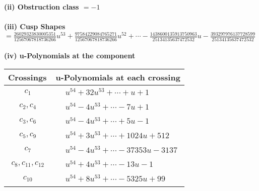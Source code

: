 \documentclass[1p]{elsarticle_modified}
\theoremstyle{definition}
\begin{document}
\flushleft \textbf{(ii) Obstruction class $= -1$}\\~\\
\flushleft \textbf{(iii) Cusp Shapes $= \frac{26029323830005351}{12567067818736266} u^{53}+\frac{97584229084765271}{12567067818736266} u^{52}+\cdots-\frac{1438600135913750963}{25134135637472532} u-\frac{393297976137728599}{25134135637472532}$}\\~\\
\newpage\renewcommand{\arraystretch}{1}
\flushleft \textbf{(iv) u-Polynomials at the component}\newline \\
\begin{tabular}{m{50pt}|m{274pt}}
Crossings & \hspace{64pt}u-Polynomials at each crossing \\
\hline $$\begin{aligned}c_{1}\end{aligned}$$&$\begin{aligned}
&u^{54}+32 u^{53}+\cdots+u+1
\end{aligned}$\\
\hline $$\begin{aligned}c_{2},c_{4}\end{aligned}$$&$\begin{aligned}
&u^{54}-4 u^{53}+\cdots-7 u+1
\end{aligned}$\\
\hline $$\begin{aligned}c_{3},c_{6}\end{aligned}$$&$\begin{aligned}
&u^{54}-4 u^{53}+\cdots+5 u-1
\end{aligned}$\\
\hline $$\begin{aligned}c_{5},c_{9}\end{aligned}$$&$\begin{aligned}
&u^{54}+3 u^{53}+\cdots+1024 u+512
\end{aligned}$\\
\hline $$\begin{aligned}c_{7}\end{aligned}$$&$\begin{aligned}
&u^{54}-4 u^{53}+\cdots-37353 u-3137
\end{aligned}$\\
\hline $$\begin{aligned}c_{8},c_{11},c_{12}\end{aligned}$$&$\begin{aligned}
&u^{54}+4 u^{53}+\cdots-13 u-1
\end{aligned}$\\
\hline $$\begin{aligned}c_{10}\end{aligned}$$&$\begin{aligned}
&u^{54}+8 u^{53}+\cdots-5325 u+99
\end{aligned}$\\
\hline
\end{tabular}\\~\\
\end{document}
